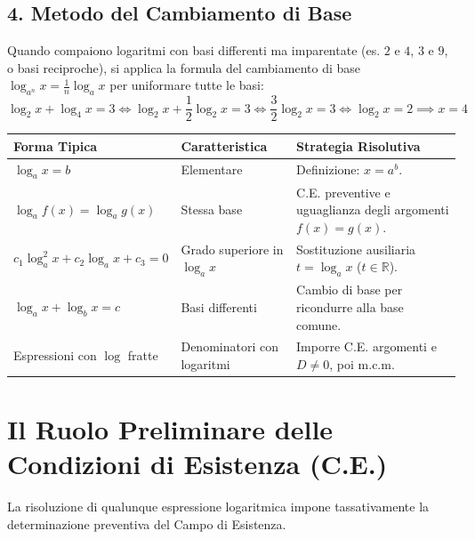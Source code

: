 \documentclass[11pt,a4paper,oneside]{report}
\begin{document}
\subsection{4. Metodo del Cambiamento di Base}
Quando compaiono logaritmi con basi differenti ma imparentate (es. $2$ e $4$, $3$ e $9$, o basi reciproche), si applica la formula del cambiamento di base $\log_{a^n} x = \frac{1}{n} \log_a x$ per uniformare tutte le basi:
\begin{equation*}
    \log_2 x + \log_4 x = 3 \iff \log_2 x + \frac{1}{2}\log_2 x = 3 \iff \frac{3}{2}\log_2 x = 3 \iff \log_2 x = 2 \implies x = 4
\end{equation*}

\begin{metodo}
\small
\begin{tabularx}{\textwidth}{l p{4.2cm} X}
\toprule
\textbf{Forma Tipica} & \textbf{Caratteristica} & \textbf{Strategia Risolutiva} \\
\midrule
$\log_a x = b$ & Elementare & Definizione: $x = a^b$. \\
$\log_a f(x) = \log_a g(x)$ & Stessa base & C.E. preventive e uguaglianza degli argomenti $f(x) = g(x)$. \\
$c_1 \log_a^2 x + c_2 \log_a x + c_3 = 0$ & Grado superiore in $\log_a x$ & Sostituzione ausiliaria $t = \log_a x$ ($t \in \mathbb{R}$). \\
$\log_a x + \log_b x = c$ & Basi differenti & Cambio di base per ricondurre alla base comune. \\
Espressioni con $\log$ fratte & Denominatori con logaritmi & Imporre C.E. argomenti e $D \neq 0$, poi m.c.m. \\
\bottomrule
\end{tabularx}
\end{metodo}

\section{Il Ruolo Preliminare delle Condizioni di Esistenza (C.E.)}
La risoluzione di qualunque espressione logaritmica impone tassativamente la determinazione preventiva del Campo di Esistenza.
\end{document}
